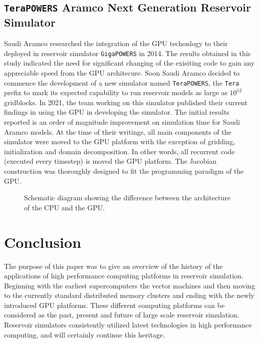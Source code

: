 \documentclass[barcolor=BrickRed,nocopyright,nolists]{asmejour}
\begin{document}
\subsection{\texttt{TeraPOWERS} Aramco Next Generation Reservoir Simulator}
Saudi Aramco researched the integration of the GPU techonlogy to their deployed in reservoir simulator \texttt{GigaPOWERS} in 2014\cite{spe163591}. The results obtained in this study indicated the need for significant changing of the exisiting code to gain any appreciable speed from the GPU architecure. Soon Saudi Aramco decided to commence the development of
a new simulator named \texttt{TeraPOWERS}, the \texttt{Tera} prefix to mark its expected capability to run reservoir models as large as $10^{12}$ gridblocks. In 2021, the team working on this simulator published their current findings in using the GPU in developing the simulator\cite{spe203918}. The initial results reported is an order of magnitude improvement
on simulation time for Saudi Aramco models. At the time of their writings, all main components of the simulator were moved to the GPU platform with the exception of gridding, initialization and domain decomposition. In other words, all recurrent code (executed every timestep) is moved the GPU platform. The Jacobian construction was thoroughly designed to fit the
programming paradigm of the GPU.

\begin{figure}[h]
	\caption{Schematic diagram showing the difference between the architecture of the CPU and the GPU.}
	\label{gpu}
\end{figure}
	
\section{Conclusion}
The purpose of this paper was to give an overview of the history of the applications of high performance computing platforms in reservoir simulation. Beginning with the earliest supercomputers the vector machines and then moving to the currently standard distributed memory clusters and ending with the newly introduced GPU platforms. These different computing
platforms can be considered as the past, present and future of large scale reservoir simulation. Reservoir simulators consistently utilized latest technologies in high performance computing, and will certainly continue this heritage.


\nocite{*} %




\end{document}

